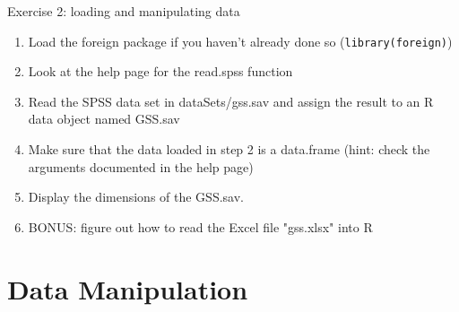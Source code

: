 \documentclass[table,smaller]{beamer}
\begin{document}
\begin{frame}[fragile,label=sec-4-6]{Exercise 2: loading and manipulating data}
 \begin{enumerate}
\item Load the foreign package if you haven't already done so (\verb~library(foreign)~)

\item Look at the help page for the read.spss function

\item Read the SPSS data set in dataSets/gss.sav and assign the result to an R data object named GSS.sav

\item Make sure that the data loaded in step 2 is a data.frame (hint: check the arguments documented in the help page)

\item Display the dimensions of the GSS.sav.

\item BONUS: figure out how to read the Excel file "gss.xlsx" into R
\end{enumerate}
\end{frame}

\section{Data Manipulation}
\label{sec-5}
\end{document}
